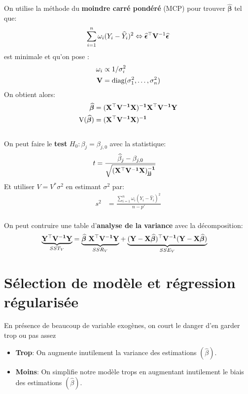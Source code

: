 \documentclass[10pt, french]{article}
\begin{document}
\begin{multicols*}{3}
On utilise la méthode du \textbf{moindre carré pondéré} (MCP) pour trouver $\widehat{\bm{\beta}}$ tel que:
\[
	\sum_{i = 1}^{n} \omega_{i}(Y_{i} - \widehat{Y}_i)^{2} \Leftrightarrow \widehat{\bm{\epsilon}}^{\top} \mathbf{V}^{-1} \widehat{\bm{\epsilon}}
	\]
est minimale et qu'on pose :
\begin{align*}
\omega_{i} &\propto 1/\sigma^{2}_{i} \\
\mathbf{V} &= \text{diag}(\sigma_{1}^{2}, \dots, \sigma_{n}^{2})
\end{align*}
On obtient alors:
\begin{align*}
	\widehat{\bm{\beta}} &= \mathbf{(X^{\top}V^{-1}X)^{-1}X^{\top}V^{-1}Y} \\
	\text{V}(\widehat{\bm{\beta}}) &= \mathbf{(X^{\top}V^{-1}X)^{-1}}
\end{align*}
\\
On peut faire le \textbf{test} $H_0 : \beta_j = \beta_{j, 0}$ avec la statistique:
\begin{align*}
	t &= \frac{\widehat{\beta}_{j} - \beta_{j, 0}}{\sqrt{(\mathbf{X^{\top}V^{-1}X)^{-1}_{jj}}}}
\end{align*}
Et utiliser $V = V^{*}\sigma^{2}$ en estimant $\sigma^{2}$ par:
\begin{align*}
	s^{2} &= \frac{\sum_{i = 1}^{n} \omega_{i}(Y_{i} - \widehat{Y}_i)^{2}}{n - p'}
\end{align*}
\\
On peut contruire une table d'\textbf{analyse de la variance} avec la décomposition:
\begin{align*}
	\underset{SST_V}{\underbrace{\matr{Y^{\top}V^{-1}Y}}} &= \underset{SSR_V}{\underbrace{\bm{\widehat{\beta}} \ \matr{X^{\top}V^{-1}Y}}} + \underset{SSE_V}{\underbrace{(\matr{Y - X}\bm{\widehat{\beta}})^{\top}\matr{V^{-1}}(\matr{Y - X}\bm{\widehat{\beta}}) }}
\end{align*}

\section{Sélection de modèle et régression régularisée}
En présence de beaucoup de variable exogènes, on court le danger d'en garder trop ou pas assez
\begin{itemize}
	\item \textbf{Trop}: On augmente inutilement la variance des estimations $(\hat{\beta})$.
	\item \textbf{Moins}: On simplifie notre modèle trops en augmentant inutilement le biais des estimations $(\hat{\beta})$.
\end{itemize}


\end{multicols*}
\end{document}
